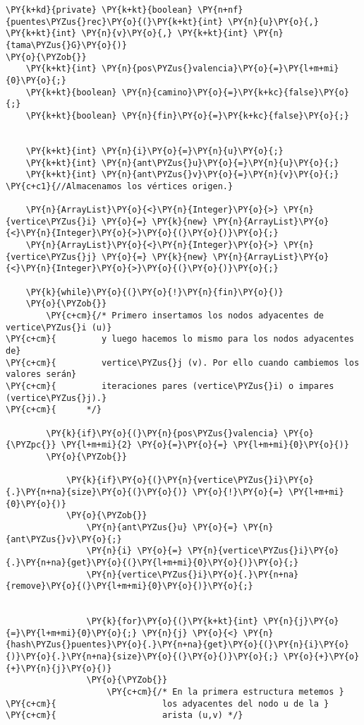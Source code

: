 \begin{Verbatim}[commandchars=\\\{\}]
\PY{k+kd}{private} \PY{k+kt}{boolean} \PY{n+nf}{puentes\PYZus{}rec}\PY{o}{(}\PY{k+kt}{int} \PY{n}{u}\PY{o}{,} \PY{k+kt}{int} \PY{n}{v}\PY{o}{,} \PY{k+kt}{int} \PY{n}{tama\PYZus{}G}\PY{o}{)}
\PY{o}{\PYZob{}}
    \PY{k+kt}{int} \PY{n}{pos\PYZus{}valencia}\PY{o}{=}\PY{l+m+mi}{0}\PY{o}{;}
    \PY{k+kt}{boolean} \PY{n}{camino}\PY{o}{=}\PY{k+kc}{false}\PY{o}{;}
    \PY{k+kt}{boolean} \PY{n}{fin}\PY{o}{=}\PY{k+kc}{false}\PY{o}{;}


    \PY{k+kt}{int} \PY{n}{i}\PY{o}{=}\PY{n}{u}\PY{o}{;}
    \PY{k+kt}{int} \PY{n}{ant\PYZus{}u}\PY{o}{=}\PY{n}{u}\PY{o}{;}
    \PY{k+kt}{int} \PY{n}{ant\PYZus{}v}\PY{o}{=}\PY{n}{v}\PY{o}{;} \PY{c+c1}{//Almacenamos los vértices origen.}

    \PY{n}{ArrayList}\PY{o}{<}\PY{n}{Integer}\PY{o}{>} \PY{n}{vertice\PYZus{}i} \PY{o}{=} \PY{k}{new} \PY{n}{ArrayList}\PY{o}{<}\PY{n}{Integer}\PY{o}{>}\PY{o}{(}\PY{o}{)}\PY{o}{;}
    \PY{n}{ArrayList}\PY{o}{<}\PY{n}{Integer}\PY{o}{>} \PY{n}{vertice\PYZus{}j} \PY{o}{=} \PY{k}{new} \PY{n}{ArrayList}\PY{o}{<}\PY{n}{Integer}\PY{o}{>}\PY{o}{(}\PY{o}{)}\PY{o}{;}

    \PY{k}{while}\PY{o}{(}\PY{o}{!}\PY{n}{fin}\PY{o}{)}
	\PY{o}{\PYZob{}}
	    \PY{c+cm}{/* Primero insertamos los nodos adyacentes de vertice\PYZus{}i (u)}
\PY{c+cm}{	       y luego hacemos lo mismo para los nodos adyacentes de}
\PY{c+cm}{	       vertice\PYZus{}j (v). Por ello cuando cambiemos los valores serán}
\PY{c+cm}{	       iteraciones pares (vertice\PYZus{}i) o impares (vertice\PYZus{}j).}
\PY{c+cm}{	    */}

	    \PY{k}{if}\PY{o}{(}\PY{n}{pos\PYZus{}valencia} \PY{o}{\PYZpc{}} \PY{l+m+mi}{2} \PY{o}{=}\PY{o}{=} \PY{l+m+mi}{0}\PY{o}{)}
		\PY{o}{\PYZob{}}

		    \PY{k}{if}\PY{o}{(}\PY{n}{vertice\PYZus{}i}\PY{o}{.}\PY{n+na}{size}\PY{o}{(}\PY{o}{)} \PY{o}{!}\PY{o}{=} \PY{l+m+mi}{0}\PY{o}{)}
			\PY{o}{\PYZob{}}
			    \PY{n}{ant\PYZus{}u} \PY{o}{=} \PY{n}{ant\PYZus{}v}\PY{o}{;}
			    \PY{n}{i} \PY{o}{=} \PY{n}{vertice\PYZus{}i}\PY{o}{.}\PY{n+na}{get}\PY{o}{(}\PY{l+m+mi}{0}\PY{o}{)}\PY{o}{;}
			    \PY{n}{vertice\PYZus{}i}\PY{o}{.}\PY{n+na}{remove}\PY{o}{(}\PY{l+m+mi}{0}\PY{o}{)}\PY{o}{;}


			    \PY{k}{for}\PY{o}{(}\PY{k+kt}{int} \PY{n}{j}\PY{o}{=}\PY{l+m+mi}{0}\PY{o}{;} \PY{n}{j} \PY{o}{<} \PY{n}{hash\PYZus{}puentes}\PY{o}{.}\PY{n+na}{get}\PY{o}{(}\PY{n}{i}\PY{o}{)}\PY{o}{.}\PY{n+na}{size}\PY{o}{(}\PY{o}{)}\PY{o}{;} \PY{o}{+}\PY{o}{+}\PY{n}{j}\PY{o}{)}
				\PY{o}{\PYZob{}}
				    \PY{c+cm}{/* En la primera estructura metemos }
\PY{c+cm}{				       los adyacentes del nodo u de la }
\PY{c+cm}{				       arista (u,v) */}


\end{Verbatim}
